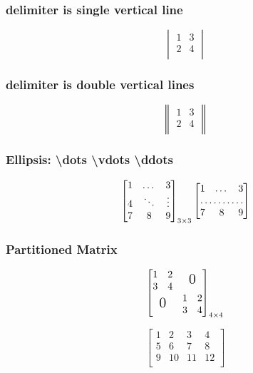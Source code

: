 \documentclass{article}
\begin{document}
\subsubsection{delimiter is single vertical line}
\[
    \begin{vmatrix}
        1 & 3 \\
        2 & 4 \\
    \end{vmatrix}
\]

\subsubsection{delimiter is double vertical lines}
\[
    \begin{Vmatrix}
        1 & 3 \\
        2 & 4 \\
    \end{Vmatrix}
\]

\subsubsection{Ellipsis: \textbackslash dots \textbackslash vdots \textbackslash ddots}
\[
\begin{bmatrix}
    1 & \dots & 3 \\
    4 & \ddots & \vdots \\
    7 & 8 & 9 \\
\end{bmatrix}_{3 \times 3}
\begin{bmatrix}
        1 & \dots & 3 \\
        \hdotsfor{3} \\
        7 & 8 & 9 \\
\end{bmatrix}
\]

\subsubsection{Partitioned Matrix}
\[
\begin{bmatrix}
    \begin{matrix}
        1 & 2 \\
        3 & 4 \\
    \end{matrix} 
    & \text{\Large 0} \\

    \text{\Large 0} 
    & \begin{matrix}
        1 & 2 \\
        3 & 4 \\
    \end{matrix} \\
\end{bmatrix}_{4 \times 4} 
\]

\[
\begin{bmatrix}
    1 & 2 & 3 & 4 \\
    5 & 6 & 7 & 8 \\
    9 & 10 & 11 & 12 \\
\end{bmatrix}
\]
\end{document}
